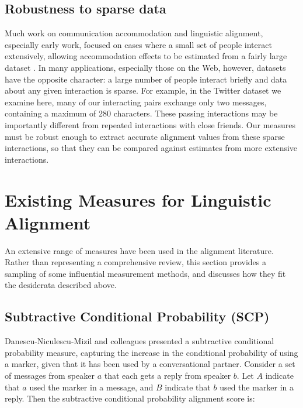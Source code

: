\documentclass{acm_proc_article-sp}
\begin{document}
\subsection{Robustness to sparse data} 

Much work on communication accommodation and linguistic alignment, especially early work, focused on cases where a small set of people interact extensively, allowing accommodation effects to be estimated from a fairly large dataset \cite{Ferrara1991,GonzalesHancockPennebaker2010,IrelandEtAl2011}.  In many applications, especially those on the Web, however, datasets have the opposite character: a large number of people interact briefly and data about any given interaction is sparse. For example, in the Twitter dataset we examine here, many of our interacting pairs exchange only two messages, containing a maximum of 280 characters. These passing interactions may be importantly different from repeated interactions with close friends.  Our measures must be robust enough to extract accurate alignment values from these sparse interactions, so that they can be compared against estimates from more extensive interactions.  

\section{Existing Measures for Linguistic Alignment}
An extensive range of measures have been used in the alignment literature. Rather than representing a comprehensive review, this section provides a sampling of some influential measurement methods, and discusses how they fit the desiderata described above.  


\subsection{Subtractive Conditional Probability (SCP)} 

Danescu-Niculescu-Mizil and colleagues \cite{DNMGamonDumais2011} presented a subtractive conditional probability measure, capturing the increase in the conditional probability of using a marker, given that it has been used by a conversational partner.  Consider a set of messages from speaker $a$ that each gets a reply from speaker $b$.  Let $A$ indicate that $a$ used the marker in a message, and $B$ indicate that $b$ used the marker in a reply.  Then the subtractive conditional probability alignment score is:
\end{document}

